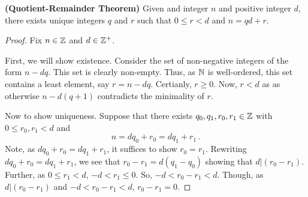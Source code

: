 \guard



\begin{thm}
\label{thm:quotientRemainderTheorem}
  \textbf{(Quotient-Remainder Theorem)}
  Given and integer $n$ and positive integer $d$, there exists unique integers $q$ and $r$ such that $0\leq r < d$ and $n=qd + r$.
\end{thm}
\begin{proof}
  Fix $n\in\mathbb{Z}$ and $d\in\mathbb{Z}^+$.

  First, we will show existence.
  Consider the set of non-negative integers of the form $n-dq$.
  This set is clearly non-empty.
  Thus, as $\mathbb{N}$ is well-ordered, this set contains a least element, say $r=n-dq$.
  Certianly, $r\geq 0$.
  Now, $r<d$ as as otherwise $n-d(q+1)$ contradicts the minimality of $r$.

  Now to show uniqueness.
  Suppose that there exists $q_0,q_1,r_0,r_1\in\mathbb{Z}$ with $0\leq r_0,r_1 <d$ and \[n=dq_0+r_0=dq_1+r_1\,.\]
  Note, as $dq_0+r_0=dq_1+r_1$, it suffices to show $r_0=r_1$.
  Rewriting $dq_0+r_0=dq_1+r_1$, we see that $r_0-r_1=d(q_1-q_0)$ showing that $d|(r_0-r_1)$.
  Further, as $0\leq r_1 <d$, $-d<r_1\leq 0$.
  So, $-d < r_0-r_1 <d$.
  Though, as $d|(r_0-r_1)$ and $-d < r_0-r_1 <d$, $r_0-r_1=0$.
\end{proof}

